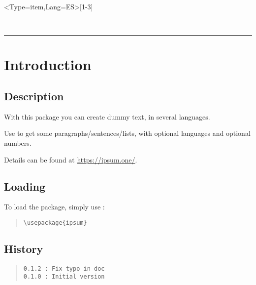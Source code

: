 \documentclass[11pt,a4paper]{ltxdoc}
\begin{document}
\begin{tcolorbox}[colframe=lightgray,colback=lightgray!5]
\ipsum<Type=item,Lang=ES>[1-3]
\end{tcolorbox}

\vfill~

\pagebreak


\hypertarget{matoc}{}

\tableofcontents

\vspace*{5mm}

\hrule

\vspace*{5mm}

\section{Introduction}

\subsection{Description}

With this package you can create dummy text, in several languages.

Use \cmd{\ipsum} to get some paragraphs/sentences/lists, with optional languages and optional numbers.

Details can be found at \url{https://ipsum.one/}.

\subsection{Loading}

To load the package, simply use :

\begin{quote}
\begin{verbatim}
\usepackage{ipsum}
\end{verbatim}
\end{quote}

\vfill

\subsection{History}

\begin{quote}
\begin{verbatim}
0.1.2 : Fix typo in doc
0.1.0 : Initial version
\end{verbatim}
\end{quote}
\end{document}
